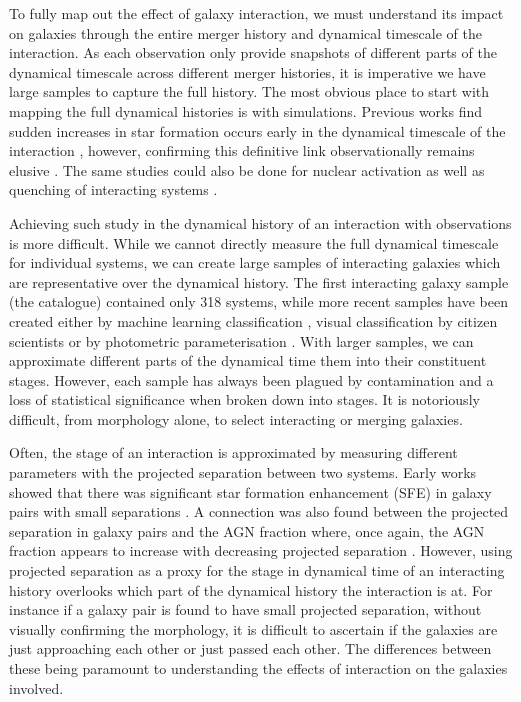 \documentclass[fleqn,usenatbib]{mnras}
\begin{document}
To fully map out the effect of galaxy interaction, we must understand its impact on galaxies through the entire merger history and dynamical timescale of the interaction. As each observation only provide snapshots of different parts of the dynamical timescale across different merger histories, it is imperative we have large samples to capture the full history. The most obvious place to start with mapping the full dynamical histories is with simulations. Previous works find sudden increases in star formation occurs early in the dynamical timescale of the interaction \citep{2008MNRAS.384..386C, 2019MNRAS.490.2139R}, however, confirming this definitive link observationally remains elusive \citep{2023ApJ...958...96R}. The same studies could also be done for nuclear activation as well as quenching of interacting systems \citep{2011MNRAS.418.2043E, 2018PASJ...70S..37G, 2023ApJ...942..107S}. 

Achieving such study in the dynamical history of an interaction with observations is more difficult. While we cannot directly measure the full dynamical timescale for individual systems, we can create large samples of interacting galaxies which are representative over the dynamical history. The first interacting galaxy sample (the \citet{1966ApJS...14....1A} catalogue) contained only 318 systems, while more recent samples have been created either by machine learning classification \citep{2019A&A...626A..49P, 2023A&A...669A.141S}, visual classification by citizen scientists \citep{2010MNRAS.401.1043D} or by photometric parameterisation \citep{2004AJ....128..163L, 2023MNRAS.522....1N}. With larger samples, we can approximate different parts of the dynamical time them into their constituent stages. However, each sample has always been plagued by contamination and a loss of statistical significance when broken down into stages. It is notoriously difficult, from morphology alone, to select interacting or merging galaxies.

Often, the stage of an interaction is approximated by measuring different parameters with the projected separation between two systems. Early works showed that there was significant star formation enhancement (SFE) in galaxy pairs with small separations \citep{2003MNRAS.346.1189L ,2008AJ....135.1877E, 2022ApJ...940....4S}. A connection was also found between the projected separation in galaxy pairs and the AGN fraction where, once again, the AGN fraction appears to increase with decreasing projected separation \citep{2009MNRAS.399.2172R, 2011MNRAS.418.2043E, 2017MNRAS.465.2671G, 2021ApJ...909..124S}. However, using projected separation as a proxy for the stage in dynamical time of an interacting history overlooks which part of the dynamical history the interaction is at. For instance if a galaxy pair is found to have small projected separation, without visually confirming the morphology, it is difficult to ascertain if the galaxies are just approaching each other or just passed each other. The differences between these being paramount to understanding the effects of interaction on the galaxies involved.
\end{document}
